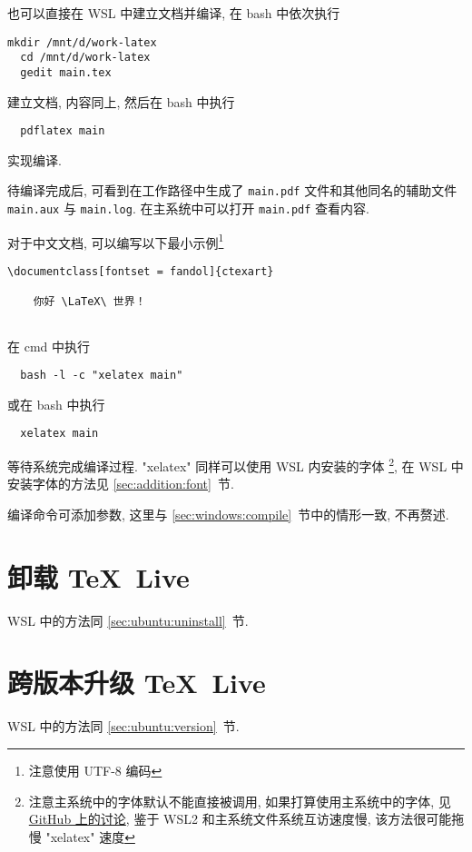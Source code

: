 也可以直接在 WSL 中建立文档并编译,
在 \textsf{bash} 中依次执行
\begin{lstlisting}[deletekeywords = tex]
  mkdir /mnt/d/work-latex
  cd /mnt/d/work-latex
  gedit main.tex
\end{lstlisting}
建立文档,
内容同上,
然后在 \textsf{bash} 中执行
\begin{lstlisting}
  pdflatex main
\end{lstlisting}
实现编译.

待编译完成后, 可看到在工作路径中生成了 \texttt{main.pdf}
文件和其他同名的辅助文件 \texttt{main.aux} 与 \texttt{main.log}.
在主系统中可以打开 \texttt{main.pdf} 查看内容.

对于中文文档,
可以编写以下最小示例\footnote{注意使用 UTF-8 编码}%
\begin{lstlisting}[language = mwe]
  \documentclass[fontset = fandol]{ctexart}
  
    你好 \LaTeX\ 世界！
  
\end{lstlisting}
在 \textsf{cmd} 中执行
\begin{lstlisting}
  bash -l -c "xelatex main"
\end{lstlisting}
或在 \textsf{bash} 中执行
\begin{lstlisting}
  xelatex main
\end{lstlisting}
等待系统完成编译过程.
"xelatex" 同样可以使用 WSL 内安装的字体%
\footnote{注意主系统中的字体默认不能直接被调用,
如果打算使用主系统中的字体,
见
\href{https://github.com/OsbertWang/install-latex-guide-zh-cn/issues/14}{GitHub 上的讨论},
鉴于 WSL2 和主系统文件系统互访速度慢,
该方法很可能拖慢 "xelatex" 速度},
在 WSL 中安装字体的方法见 \ref{sec:addition:font}~节.

编译命令可添加参数, 这里与 \ref{sec:windows:compile}~节中的情形一致, 不再赘述.

\section{卸载 \TeX~Live}

WSL 中的方法同 \ref{sec:ubuntu:uninstall}~节.

\section{跨版本升级 \TeX~Live}

WSL 中的方法同 \ref{sec:ubuntu:version}~节.
